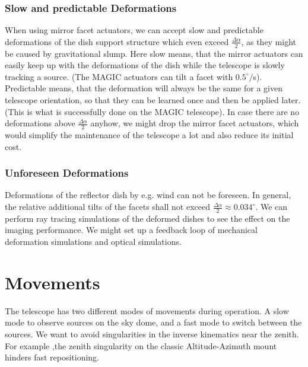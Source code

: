 \documentclass[11pt,a4paper,oneside,titlepage]{article}
\begin{document}
\subsubsection{Slow and predictable Deformations}
%
When using mirror facet actuators, we can accept slow and predictable deformations of the dish support structure which even exceed $\frac{\Delta \alpha}{2}$, as they might be caused by gravitational slump.
%
Here slow means, that the mirror actuators can easily keep up with the deformations of the dish while the telescope is slowly tracking a source.
%
(The MAGIC actuators can tilt a facet with $0.5^\circ/$s).
%
Predictable means, that the deformation will always be the same for a given telescope orientation, so that they can be learned once and then be applied later. (This is what is successfully done on the MAGIC telescope).
%
In case there are no deformations above $\frac{\Delta \alpha}{2}$ anyhow, we might drop the mirror facet actuators, which would simplify the maintenance of the telescope a lot and also reduce its initial cost.
\subsubsection{Unforeseen Deformations}
%
Deformations of the reflector dish by e.g. wind can not be foreseen. In general, the relative additional tilts of the facets shall not exceed \mbox{$\frac{\Delta \alpha}{2} \approx 0.034^\circ$}.
%
We can perform ray tracing simulations of the deformed dishes to see the effect on the imaging performance.
%
We might set up a feedback loop of mechanical deformation simulations and optical simulations. 
\section{Movements}
The telescope has two different modes of movements during operation.
%
A slow mode to observe sources on the sky dome, and a fast mode to switch between the sources.
%
We want to avoid singularities in the inverse kinematics near the zenith.
%
For example ,the zenith singularity on the classic Altitude-Azimuth mount hinders fast repositioning.
\end{document}
